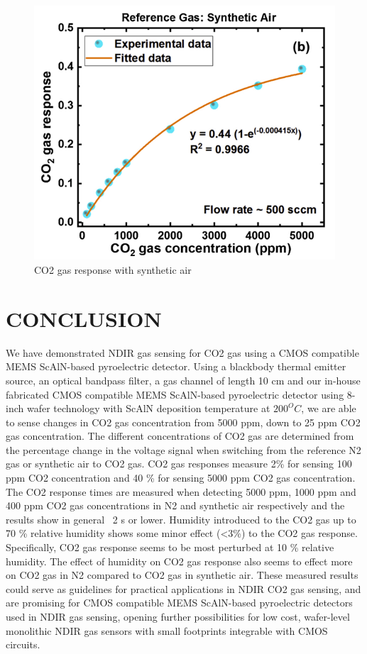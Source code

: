 \documentclass[12pt]{article}
\begin{document}
\begin{figure}[h]
\centering
\includegraphics[scale=0.5]{CO2 gas resp in presence of SA.png}
\caption{CO2 gas response with synthetic air}
\label{NCO2 gas response with synthetic air}
\end{figure}



\section{CONCLUSION}
We have demonstrated NDIR gas sensing for CO2 gas using a CMOS 
compatible MEMS ScAlN-based pyroelectric detector. Using a blackbody 
thermal emitter source, an optical bandpass filter, a gas channel of 
length 10 cm and our in-house fabricated CMOS compatible MEMS 
ScAlN-based pyroelectric detector using 8-inch wafer technology with 
ScAlN deposition temperature at $200^{O}C$, we are able to sense changes 
in CO2 gas concentration from 5000 ppm, down to 25 ppm CO2 gas 
concentration. The different concentrations of CO2 gas are determined 
from the percentage change in the voltage signal when switching from 
the reference N2 gas or synthetic air to CO2 gas. CO2 gas responses 
measure 2\% for sensing 100 ppm CO2 concentration and 40 \% for 
sensing 5000 ppm CO2 gas concentration. The CO2 response times are 
measured when detecting 5000 ppm, 1000 ppm and 400 ppm CO2 gas 
concentrations in N2 and synthetic air respectively and the results show 
in general ~2 s or lower. Humidity introduced to the CO2 gas up to 70 \% 
relative humidity shows some minor effect (<3\%) to the CO2 gas 
response. Specifically, CO2 gas response seems to be most perturbed at 
10 \% relative humidity. The effect of humidity on CO2 gas response also 
seems to effect more on CO2 gas in N2 compared to CO2 gas in synthetic 
air\cite{tan2020non}. These measured results could serve as guidelines for practical applications in NDIR CO2 gas sensing, and are promising for CMOS 
compatible MEMS ScAlN-based pyroelectric detectors used in NDIR gas 
sensing, opening further possibilities for low cost, wafer-level monolithic NDIR gas sensors with small footprints integrable with CMOS 
circuits.
\clearpage



\end{document}
